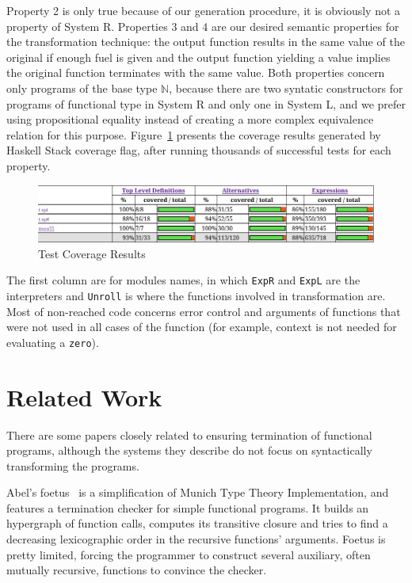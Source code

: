 \documentclass[runningheads]{llncs}
\newcommand{\tN}{\mathbb{N}}
\begin{document}
\noindent Property 2 is only true because of our generation 
procedure, it is obviously not a property of 
System R. Properties 3 and 4 are our desired 
semantic properties for the transformation 
technique: the output function results in the same 
value of the original if enough fuel is given and 
the output function yielding a value implies the 
original function terminates with the same value.
Both properties concern only programs of the base 
type $\tN$, because there are two syntatic 
constructors for programs of functional type in 
System R and only one in System L, and we prefer 
using propositional equality instead of creating a 
more complex equivalence relation for this purpose.
Figure~\ref{fig:coverage} presents the coverage results generated 
by Haskell Stack coverage flag, after running 
thousands of successful tests for each 
property.

\begin{figure}
  \includegraphics*[width=\textwidth]{coverage.png}
  \caption{Test Coverage Results}
  \label{fig:coverage}
\end{figure}

\noindent The first column are for modules names, 
in which {\tt ExpR} and {\tt ExpL} are the 
interpreters and {\tt Unroll} is where the 
functions involved in transformation are. Most of 
non-reached code concerns error control and 
arguments of functions that were not used in 
all cases of the function (for example, context is 
not needed for evaluating a {\tt zero}).

\section{Related Work}
There are some papers closely related to ensuring 
termination of functional programs, although the systems they 
describe do not focus on syntactically transforming the programs. 

Abel's 
foetus~\cite{abel98,abel99,abel99a,abel02} is a 
simplification of Munich Type Theory Implementation, and 
features a termination checker for simple functional 
programs. It builds an hypergraph of function calls, 
computes its transitive closure and tries to find a 
decreasing lexicographic order in the recursive 
functions' arguments. Foetus is pretty limited, forcing 
the programmer to construct several auxiliary, often 
mutually recursive, functions to convince the checker.
\end{document}
